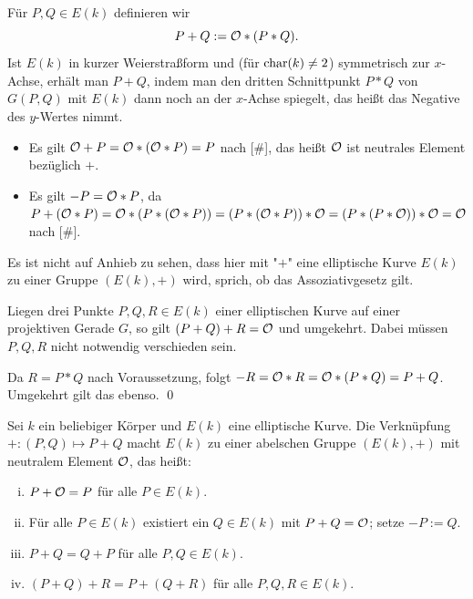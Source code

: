 \begin{defn}
	Für $P,Q \in E(k)$ definieren wir
	\[P + Q := \mathcal{O} *(P * Q). \]
	Ist $E(k)$ in kurzer Weierstraßform und (für $\operatorname{char}(k) \neq 2$) symmetrisch zur $x$-Achse, erhält man $P+Q$, indem man den dritten Schnittpunkt $P*Q$ von $G(P,Q)$ mit $E(k)$ dann noch an der $x$-Achse spiegelt, das heißt das Negative des $y$-Wertes nimmt.
\end{defn}

\begin{bem}
\label{bem_13.8}
	\begin{itemize}
		\item Es gilt $\mathcal{O} + P = \mathcal{O} * (\mathcal{O} * P) = P$ nach [\#], das heißt $\mathcal{O}$ ist neutrales Element bezüglich $+$.
		\item Es gilt $-P = \mathcal{O} * P$, da $P + (\mathcal{O} * P) = \mathcal{O} * (P * (\mathcal{O} * P)) = (P * (\mathcal{O} * P)) * \mathcal{O} = (P * (P * \mathcal{O})) * \mathcal{O} = \mathcal{O}$ nach [\#].
	\end{itemize}
\end{bem}
Es ist nicht auf Anhieb zu sehen, dass hier mit "$+$" eine elliptische Kurve $E(k)$ zu einer Gruppe $(E(k),+)$ wird, sprich, ob das Assoziativgesetz gilt.

\begin{lemma}
\label{lemma_13.9}
	Liegen drei Punkte $P,Q,R \in E(k)$ einer elliptischen Kurve auf einer projektiven Gerade $G$, so gilt $(P+Q) + R = \mathcal{O}$ und umgekehrt. Dabei müssen $P,Q,R$ nicht notwendig verschieden sein.
\end{lemma}

	Da $R = P *Q$ nach Voraussetzung, folgt $-R = \mathcal{O} * R = \mathcal{O} * (P * Q) = P+Q$. Umgekehrt gilt das ebenso. \qed
	
\begin{satz}
	Sei $k$ ein beliebiger Körper und $E(k)$ eine elliptische Kurve. Die Verknüpfung $+ \colon (P,Q) \mapsto P +Q$ macht $E(k)$ zu einer abelschen Gruppe $(E(k),+)$ mit neutralem Element $\mathcal{O}$, das heißt:
	\begin{enumerate}[(i)]
		\item $P+\mathcal{O} = P$ für alle $P \in E(k)$.
		\item Für alle $P \in E(k)$ existiert ein $Q \in E(k)$ mit $P+Q = \mathcal{O}$; setze $-P := Q$.
		\item $P + Q = Q + P$ für alle $P,Q \in E(k)$.
		\item $(P+Q) + R = P+(Q+R)$ für alle $P,Q,R \in E(k)$.
	\end{enumerate}
\end{satz}

